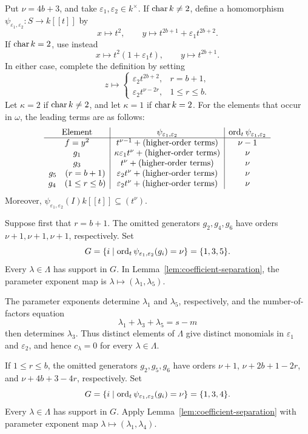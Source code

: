 Put $\nu=4b+3$, and take $\varepsilon_1,\varepsilon_2\in k^\times$.  If
$\operatorname{char} k\neq2$, define a homomorphism
$\psi_{\varepsilon_1,\varepsilon_2}\colon S\to k[[t]]$ by
$$
 x\longmapsto t^2,\qquad
 y\longmapsto t^{2b+1}+\varepsilon_1t^{2b+2}.
$$
If $\operatorname{char} k=2$, use instead
$$
 x\longmapsto t^2(1+\varepsilon_1t),\qquad
 y\longmapsto t^{2b+1}.
$$
In either case, complete the definition by setting
$$
 z\longmapsto
 \begin{cases}
  \varepsilon_2t^{2b+2},&r=b+1,\\
  \varepsilon_2t^{\nu-2r},&1\leq r\leq b.
 \end{cases}
$$
Let $\kappa=2$ if $\operatorname{char} k\neq2$, and let $\kappa=1$ if
$\operatorname{char} k=2$.  For the elements that occur in $\omega$, the
leading terms are as follows:
\[
\begin{array}{c|c|c}
 \text{Element}&\psi_{\varepsilon_1,\varepsilon_2}&
 \operatorname{ord}_t\psi_{\varepsilon_1,\varepsilon_2}\\ \hline
 f=y^2&t^{\nu-1}+\text{(higher-order terms)}&\nu-1\\
 g_1&\kappa\varepsilon_1t^\nu+\text{(higher-order terms)}&\nu\\
 g_3&t^\nu+\text{(higher-order terms)}&\nu\\
 g_5\quad(r=b+1)&\varepsilon_2t^\nu+\text{(higher-order terms)}&\nu\\
 g_4\quad(1\leq r\leq b)&\varepsilon_2t^\nu+\text{(higher-order terms)}&\nu
\end{array}
\]
Moreover, $\psi_{\varepsilon_1,\varepsilon_2}(I)k[[t]]\subseteq(t^\nu)$.

Suppose first that $r=b+1$. The omitted generators $g_2,g_4,g_6$
have orders $\nu+1,\nu+1,\nu+1$, respectively. Set
\[
 G=\{i\mid\operatorname{ord}_t\psi_{\varepsilon_1,\varepsilon_2}(g_i)=\nu\}=\{1,3,5\}.
\]
Every $\lambda\in\Lambda$ has support in $G$.
In Lemma~\ref{lem:coefficient-separation}, the parameter exponent map is
$\lambda\mapsto(\lambda_1,\lambda_5)$.

The parameter exponents determine $\lambda_1$ and $\lambda_5$, respectively, and the
number-of-factors equation
$$
 \lambda_1+\lambda_3+\lambda_5=s-m
$$
then determines $\lambda_3$.  Thus distinct elements of $\Lambda$ give
distinct monomials in $\varepsilon_1$ and $\varepsilon_2$, and hence
$c_\lambda=0$ for every
$\lambda\in\Lambda$.

If $1\leq r\leq b$, the omitted generators $g_2,g_5,g_6$ have orders
$\nu+1$, $\nu+2b+1-2r$, and $\nu+4b+3-4r$, respectively.
Set
\[
 G=\{i\mid\operatorname{ord}_t\psi_{\varepsilon_1,\varepsilon_2}(g_i)=\nu\}=\{1,3,4\}.
\]
Every $\lambda\in\Lambda$ has support in $G$. Apply Lemma~\ref{lem:coefficient-separation}
with parameter exponent map $\lambda\mapsto(\lambda_1,\lambda_4)$.

